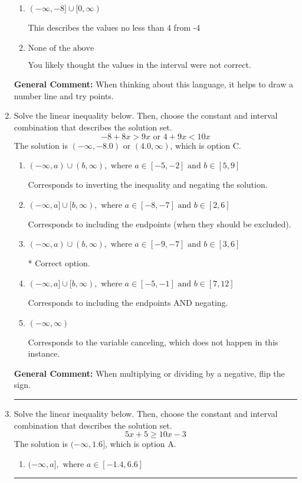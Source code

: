 \documentclass{extbook}[14pt]
\newcommand{\litem}[1]{\item #1

\rule{\textwidth}{0.4pt}}
\begin{document}
\begin{enumerate}
{\begin{enumerate}[label=\Alph*.]
This describes the values less than 4 from -4
\item \( (-\infty, -8] \cup [0, \infty) \)

This describes the values no less than 4 from -4
\item \( \text{None of the above} \)

You likely thought the values in the interval were not correct.
\end{enumerate}

\textbf{General Comment:} When thinking about this language, it helps to draw a number line and try points.
}
\litem{
Solve the linear inequality below. Then, choose the constant and interval combination that describes the solution set.
\[ -8 + 8 x > 9 x \text{ or } 4 + 9 x < 10 x \]The solution is \( (-\infty, -8.0) \text{ or } (4.0, \infty) \), which is option C.\begin{enumerate}[label=\Alph*.]
\item \( (-\infty, a) \cup (b, \infty), \text{ where } a \in [-5, -2] \text{ and } b \in [5, 9] \)

Corresponds to inverting the inequality and negating the solution.
\item \( (-\infty, a] \cup [b, \infty), \text{ where } a \in [-8, -7] \text{ and } b \in [2, 6] \)

Corresponds to including the endpoints (when they should be excluded).
\item \( (-\infty, a) \cup (b, \infty), \text{ where } a \in [-9, -7] \text{ and } b \in [3, 6] \)

 * Correct option.
\item \( (-\infty, a] \cup [b, \infty), \text{ where } a \in [-5, -1] \text{ and } b \in [7, 12] \)

Corresponds to including the endpoints AND negating.
\item \( (-\infty, \infty) \)

Corresponds to the variable canceling, which does not happen in this instance.
\end{enumerate}

\textbf{General Comment:} When multiplying or dividing by a negative, flip the sign.
}
\litem{
Solve the linear inequality below. Then, choose the constant and interval combination that describes the solution set.
\[ 5x + 5 \geq 10x -3 \]The solution is \( (-\infty, 1.6] \), which is option A.\begin{enumerate}[label=\Alph*.]
\item \( (-\infty, a], \text{ where } a \in [-1.4, 6.6] \)


\end{enumerate}}
\end{enumerate}
\end{document}
